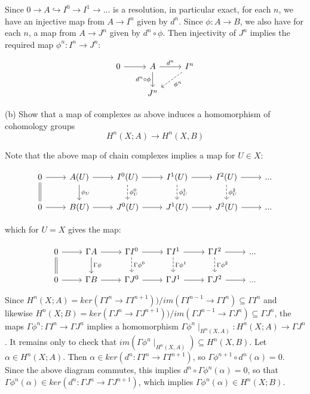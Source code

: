 Since $0 \rightarrow A \hookrightarrow I^0 \rightarrow I^1 \rightarrow ...$ is a resolution, in particular exact, for each $n$, we have an injective map from $A \rightarrow I^n$ given by $d^n$. Since $\phi: A \rightarrow B$, we also have for each $n$, a map from $A \rightarrow J^n$ given by $d^n \circ \phi$. Then injectivity of $J^n$ implies the required map $\phi^n:I^n \rightarrow J^n$: 

\[
\begin{tikzcd}
0 \arrow[r] 
& A \arrow[r, "d^n"] \arrow[d, "d^n \circ \phi"']
& I^n \arrow[ld, "\phi^n", dashed]
\\
& 
J^n 
\end{tikzcd}
\]

 (b) Show that a map of complexes as above induces a homomorphism of cohomology groups 
\[ H^n(X;A) \rightarrow H^n(X,B)\] 

Note that the above map of chain complexes implies a map for $U \in X$:

\[
\begin{tikzcd}
0 \arrow[r] \arrow[d, equal]
& A(U) \arrow[r] \arrow[d, "\phi_U"]
& I^0(U) \arrow[r] \arrow[d, "\phi^0_U", dashed]
& I^1(U) \arrow[r] \arrow[d, "\phi^1_U", dashed]
& I^2(U) \arrow[r] \arrow[d, "\phi^2_U", dashed]
& ...
\\
0 \arrow[r]
& B(U) \arrow[r]
& J^0(U) \arrow[r]
& J^1(U) \arrow[r]
& J^2(U) \arrow[r]
& ...
\end{tikzcd}
\]

which for $U = X$ gives the map:

\[
\begin{tikzcd}
0 \arrow[r] \arrow[d, equal]
& \Gamma A \arrow[r] \arrow[d, "\Gamma \phi"]
& \Gamma I^0 \arrow[r] \arrow[d, "\Gamma \phi^0", dashed]
& \Gamma I^1 \arrow[r] \arrow[d, "\Gamma \phi^1", dashed]
& \Gamma I^2 \arrow[r] \arrow[d, "\Gamma \phi^2", dashed]
& ...
\\
0 \arrow[r]
& \Gamma B \arrow[r]
& \Gamma J^0 \arrow[r]
& \Gamma J^1 \arrow[r]
& \Gamma J^2 \arrow[r]
& ...
\end{tikzcd}
\]

Since $H^n(X;A) = ker(\Gamma I^n \rightarrow \Gamma I^{n+1})) /im (\Gamma I^{n-1} \rightarrow \Gamma I^n) \subseteq \Gamma I^n$ and likewise $H^n(X;B) = ker(\Gamma J^n \rightarrow \Gamma J^{n+1})) /im (\Gamma J^{n-1} \rightarrow \Gamma J^n) \subseteq \Gamma J^n$, the maps $\Gamma \phi^n: \Gamma I^n \rightarrow \Gamma J^n$ implies a homomorphism $\Gamma \phi^n\mid_{H^n(X,A)}: H^n(X;A) \rightarrow \Gamma J^n$. It remains only to check that $im(\Gamma \phi^n\mid_{H^n(X,A)}) \subseteq H^n(X,B)$. Let $\alpha \in H^n(X;A)$. Then $\alpha \in ker(d^{n}:\Gamma I^n \rightarrow \Gamma I^{n+1}) $, so $\Gamma\phi^{n+1} \circ d^{n} (\alpha) =0$. Since the above diagram commutes, this implies $d^n \circ \Gamma \phi^n (\alpha) =0$, so that $\Gamma \phi^n (\alpha) \in ker(d^n:\Gamma J^n \rightarrow \Gamma J^{n+1})$, which implies $\Gamma \phi^n (\alpha) \in H^n(X;B)$. 

